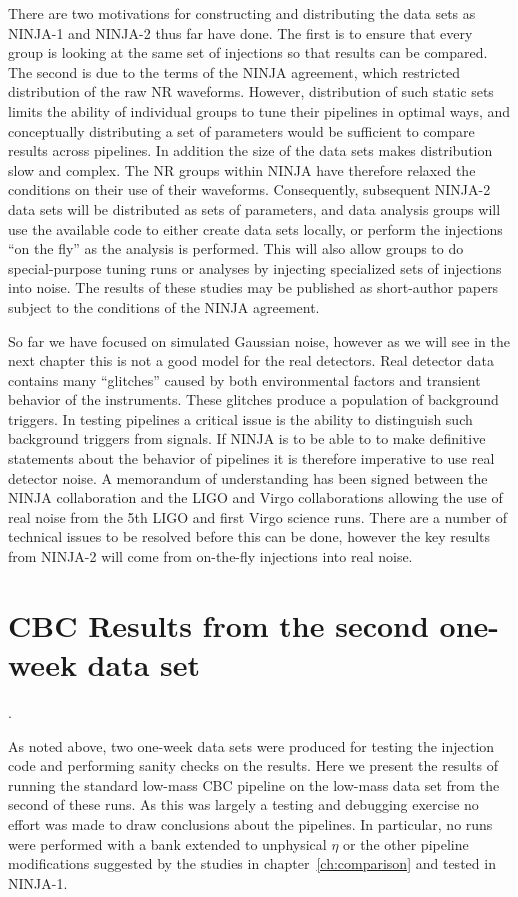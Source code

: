 There are two motivations for constructing and distributing the data
sets as NINJA-1 and NINJA-2 thus far have done.  The first is to
ensure that every group is looking at the same set of injections so
that results can be compared.  The second is due to the terms of the
NINJA agreement, which restricted distribution of the raw NR
waveforms.  However, distribution of such static sets limits the
ability of individual groups to tune their pipelines in optimal ways,
and conceptually distributing a set of parameters would be sufficient
to compare results across pipelines.  In addition the size of the data
sets makes distribution slow and complex.  The NR groups within NINJA
have therefore relaxed the conditions on their use of their waveforms.
Consequently, subsequent NINJA-2 data sets will be distributed as sets
of parameters, and data analysis groups will use the available code to
either create data sets locally, or perform the injections ``on the
fly'' as the analysis is performed.  This will also allow groups to do
special-purpose tuning runs or analyses by injecting specialized 
sets of injections into noise.  The results of these studies may be
published as short-author papers subject to the conditions of the
NINJA agreement.

So far we have focused on simulated Gaussian noise, however as we will
see in the next chapter this is not a good model for the real
detectors.  Real detector data contains many ``glitches'' caused by
both environmental factors and transient behavior of the instruments.
These glitches produce a population of background triggers.  In
testing pipelines a critical issue is the ability to distinguish such
background triggers from signals.  If NINJA is to be able to to make
definitive statements about the behavior of pipelines it is therefore
imperative to use real detector noise.  A memorandum of understanding
has been signed between the NINJA collaboration and the LIGO and Virgo
collaborations allowing the use of real noise from the 5th LIGO and
first Virgo science runs.  There are a number of technical issues to
be resolved before this can be done, however the key results from
NINJA-2 will come from on-the-fly injections into real noise.

\section{CBC Results from the second one-week data set}
\label{sec:ninja2_test_week}.

As noted above, two one-week data sets were produced for testing the
injection code and performing sanity checks on the results.  Here we
present the results of running the standard low-mass CBC pipeline on
the low-mass data set from the second of these runs.  As this was
largely a testing and debugging exercise no effort was made to draw
conclusions about the pipelines.  In particular, no runs were
performed with a bank extended to unphysical $\eta$ or the other
pipeline modifications suggested by the studies in
chapter~\ref{ch:comparison} and tested in NINJA-1.

